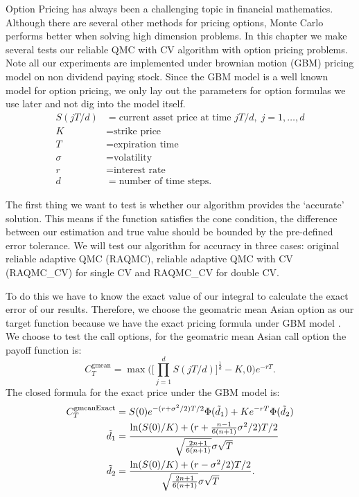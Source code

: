 

Option Pricing has always been a challenging topic in financial mathematics. 
Although there are several other methods for pricing options, Monte Carlo performs better when solving high dimension problems.
In this chapter we make several tests our reliable QMC with CV algorithm with option pricing problems. 
Note all our experiments are implemented under brownian motion (GBM) pricing model on non dividend paying stock.  
Since the GBM model is a well known model for option pricing, we only lay out the parameters for option formulas we use later and not dig into the model itself. 
\begin{align*}
    S(jT/d)&=\text{current asset price at time $jT/d,\; j=1,\dots,d$}\\
    K&=\text{strike price}\\
    T&=\text{expiration time}\\
    \sigma&=\text{volatility}\\
    r&=\text{interest rate}\\
    d&=\text{number of time steps}.
\end{align*}

The first thing we want to test is whether our algorithm provides the `accurate' solution. 
This means if the function satisfies the cone condition, the difference between our estimation and true value should be bounded by the pre-defined error tolerance. 
We will test our algorithm for accuracy in three cases: original reliable adaptive QMC (RAQMC), reliable adaptive QMC with CV (RAQMC\_CV) for single CV and RAQMC\_CV for double CV. 

To do this we have to know the exact value of our integral to calculate the exact error of our results. 
Therefore, we choose the geomatric mean Asian option as our target function because we have the exact pricing formula under GBM model \cite{kemna1990pricing}. 
We choose to test the call options, for the geomatric mean Asian call option the payoff function is:   
\[ C_{T}^{\mathrm{gmean}} = \max\Big(\Big[\prod_{j=1}^{d}S(jT/d) \Big]^\frac{1}{d}-K, 0\Big)e^{-rT}.\]
The closed formula for the exact price under the GBM model is: 
\begin{align}
    C_{T}^{\mathrm{gmeanExact}} 
    &= S(0)e^{-(r+\sigma^2/2)T/2}\Phi(\tilde{d}_1)+Ke^{-rT}\Phi(\tilde{d}_2)    \label{eq:exactgmean}\\
    \tilde{d}_1 &=\frac{\ln(S(0)/K)+(r+\frac{n-1}{6(n+1)}\sigma^2/2)T/2}
    {\sqrt{\frac{2n+1}{6(n+1)}}\sigma\sqrt{T}}\notag\\
    \tilde{d}_2 &=\frac{\ln(S(0)/K)+(r-\sigma^2/2)T/2}
            {\sqrt{\frac{2n+1}{6(n+1)}}\sigma\sqrt{T}}\notag.
\end{align}

